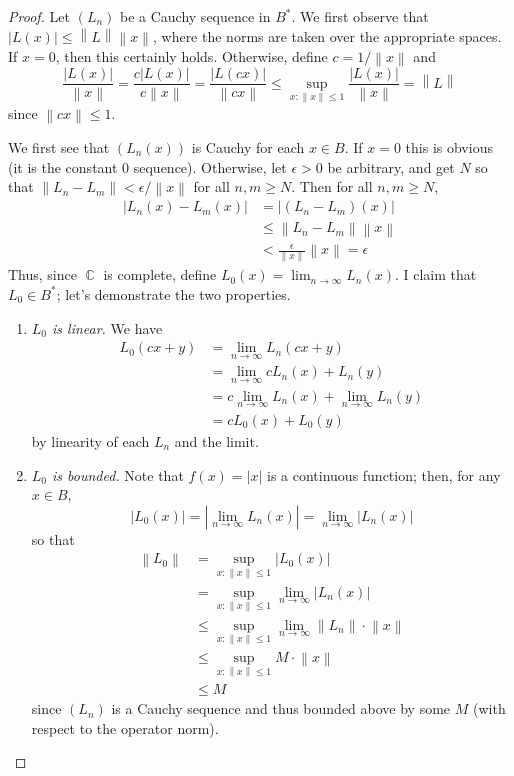 \documentclass[12pt, a4paper]{book}
\DeclareMathOperator{\C}{\mathbb{C}}
\newcommand{\norm}[1]{\left\lVert#1\right\rVert} %
\theoremstyle{nonumberplain}
\newtheorem{proof}{Proof}
\begin{document}
\begin{proof}
    Let $(L_n)$ be a Cauchy sequence in $B^*$.
    We first observe that $|L(x)|\leq\norm{L}\norm{x}$, where the norms are taken over the appropriate spaces.
    If $x=0$, then this certainly holds.
    Otherwise, define $c=1/\norm{x}$ and
    \[\frac{|L(x)|}{\norm{x}}=\frac{c|L(x)|}{c\norm{x}}=\frac{|L(cx)|}{\norm{cx}}\leq\sup_{x:\norm{x}\leq 1}\frac{|L(x)|}{\norm{x}}=\norm{L}\]
    since $\norm{cx}\leq 1$.

    We first see that $(L_n(x))$ is Cauchy for each $x\in B$.
    If $x=0$ this is obvious (it is the constant 0 sequence).
    Otherwise, let $\epsilon>0$ be arbitrary, and get $N$ so that $\norm{L_n-L_m}<\epsilon/\norm{x}$ for all $n,m\geq N$.
    Then for all $n,m\geq N$,
    \begin{align*}
        |L_n(x)-L_m(x)| &= |(L_n-L_m)(x)|\\
                        &\leq \norm{L_n-L_m}\norm{x}\\
                        &< \frac{\epsilon}{\norm{x}}\norm{x}=\epsilon
    \end{align*}
    Thus, since $\C$ is complete, define $L_0(x)=\lim_{n\to\infty} L_n(x)$.
    I claim that $L_0\in B^*$; let's demonstrate the two properties.
    \begin{enumerate}[nolistsep]
        \item \textit{$L_0$ is linear.}
            We have
            \begin{align*}
                L_0(cx+y) &= \lim_{n\to\infty} L_n(cx+y)\\
                          &= \lim_{n\to\infty}cL_n(x)+L_n(y)\\
                          &= c\lim_{n\to\infty} L_n(x)+\lim_{n\to\infty}L_n(y)\\
                          &= c L_0(x)+L_0(y)
            \end{align*}
            by linearity of each $L_n$ and the limit.
        \item \textit{$L_0$ is bounded.}
            Note that $f(x)=|x|$ is a continuous function; then, for any $x\in B$,
            \begin{equation*}
                |L_0(x)| = \left\lvert\lim_{n\to\infty}L_n(x)\right\rvert=\lim_{n\to\infty}|L_n(x)| %
            \end{equation*}
            so that
            \begin{align*}
                \norm{L_0} &= \sup_{x:\norm{x}\leq 1}|L_0(x)|\\
                           &= \sup_{x:\norm{x}\leq 1}\lim_{n\to\infty}|L_n(x)|\\
                           &\leq \sup_{x:\norm{x}\leq 1}\lim_{n\to\infty}\norm{L_n}\cdot\norm{x}\\
                           &\leq \sup_{x:\norm{x}\leq 1}M\cdot\norm{x}\\
                           &\leq M
            \end{align*}
            since $(L_n)$ is a Cauchy sequence and thus bounded above by some $M$ (with respect to the operator norm).
    \end{enumerate}
\end{proof}
\end{document}
